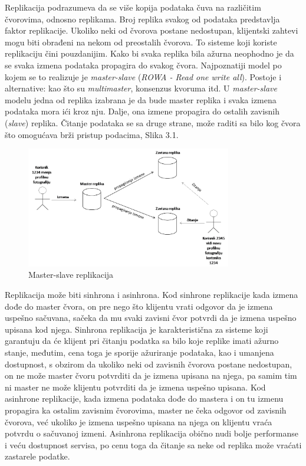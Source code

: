 \documentclass[12pt,oneside]{memoir}
\begin{document}
Replikacija podrazumeva da se više kopija podataka čuva na različitim čvorovima, odnosno replikama. Broj replika svakog od podataka predstavlja faktor replikacije. Ukoliko neki od čvorova postane nedostupan, klijentski zahtevi mogu biti obrađeni na nekom od preostalih čvorova. To sisteme koji koriste replikaciju čini pouzdanijim. Kako bi svaka replika bila ažurna neophodno je da se svaka izmena podataka propagira do svakog čvora. Najpoznatiji model po kojem se to realizuje je \textit{master-slave} (\textit{ROWA - Read one write all}). Postoje i alternative: kao što su \textit{multimaster}, konsenzus kvoruma itd. U \textit{master-slave} modelu jedna od replika izabrana je da bude master replika i svaka izmena podataka mora ići kroz nju. Dalje, ona izmene propagira do ostalih zavisnih (\textit{slave}) replika. Čitanje podataka se sa druge strane, može 
raditi sa bilo kog čvora što omogućava brži pristup podacima, Slika 3.1.

\begin{figure}[!ht]
  \centering
  \includegraphics[width=0.8\textwidth]{master-slave.png}
  \caption{Master-slave replikacija}
  \label{fig:grafikon}
\end{figure}


Replikacija može biti sinhrona i asinhrona. Kod sinhrone replikacije kada izmena dođe do master čvora, on pre nego što klijentu vrati odgovor da je izmena uspešno sačuvana, sačeka da mu svaki zavisni čvor potvrdi da je izmena uspešno upisana kod njega. Sinhrona replikacija je karakteristična za sisteme koji garantuju da će klijent pri čitanju podatka sa bilo koje replike imati ažurno stanje, međutim, cena toga je sporije ažuriranje podataka, kao i umanjena dostupnost, s obzirom da ukoliko neki od zavisnih čvorova postane nedostupan, on ne može master čvoru potvrditi da je izmena upisana na njega, pa samim tim ni master ne može klijentu potvrditi da je izmena uspešno upisana. Kod asinhrone replikacije, kada izmena podataka dođe do mastera i on tu izmenu propagira ka ostalim zavisnim čvorovima, master ne čeka odgovor od zavisnih čvorova, već ukoliko je izmena uspešno upisana na njega on klijentu vraća potvrdu o sačuvanoj izmeni. Asinhrona replikacija obično nudi bolje performanse i veću dostupnost servisa, po cenu toga da čitanje sa neke od replika može vraćati zastarele podatke.
\end{document}

